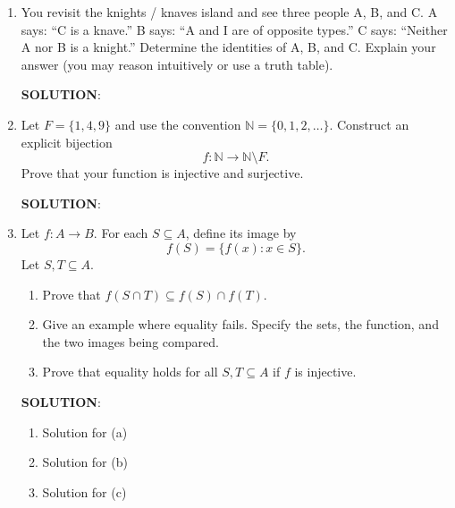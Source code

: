 \documentclass[12pt]{article}
\newcommand{\sol}{\par{\bf SOLUTION}: }
\theoremstyle{plain}
\theoremstyle{definition}
\begin{document}
\begin{enumerate}
\item You revisit the knights / knaves island and see three people A, B, and C. A says: ``C is a knave.'' B says: ``A and I are of opposite types.'' C says: ``Neither A nor B is a knight.'' Determine the identities of A, B, and C. Explain your answer (you may reason intuitively or use a truth table).

\sol %

\item Let $F=\{1,4,9\}$ and use the convention
$\mathbb{N}=\{0,1,2,\ldots\}$. Construct an explicit bijection
\[
f:\mathbb{N}\longrightarrow\mathbb{N}\setminus F.
\]
Prove that your function is injective and surjective.

\sol %

\item Let $f:A\to B$. For each $S\subseteq A$, define its image by
\[
f(S)=\{f(x):x\in S\}.
\]
Let $S,T\subseteq A$.
\begin{enumerate}
\item Prove that $f(S\cap T)\subseteq f(S)\cap f(T)$.
\item Give an example where equality fails. Specify the sets, the function, and the two images being compared.
\item Prove that equality holds for all $S,T\subseteq A$ if $f$ is injective.
\end{enumerate}

\sol
\begin{enumerate}
\item Solution for (a)
\item Solution for (b)
\item Solution for (c)
\end{enumerate}

\end{enumerate}
\end{document}
